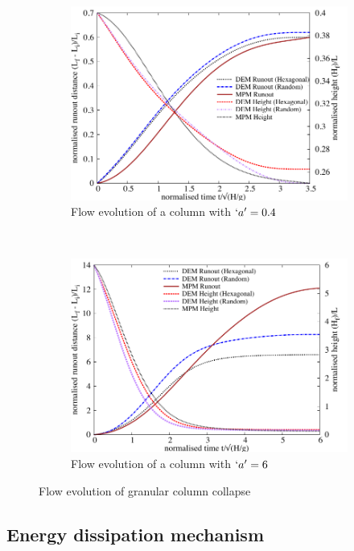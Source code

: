 \begin{figure}[tbhp]
\centering
\begin{subfigure}[b]{0.975\textwidth}
\centering
\includegraphics[width=\textwidth]{flowa04}
\caption{Flow evolution of a column with $`a'=0.4$}
\label{fig:flowa04}
\end{subfigure}
\\
\begin{subfigure}[b]{0.975\textwidth}
\centering
\includegraphics[width=\textwidth]{flowa6}
\caption{Flow evolution of a column with $`a'=6$}
\label{fig:flowa6}
\end{subfigure}
\caption{Flow evolution of granular column collapse}
\label{fig:flow_column}
\end{figure}

\subsection{Energy dissipation mechanism}
\label{sec:energy}

